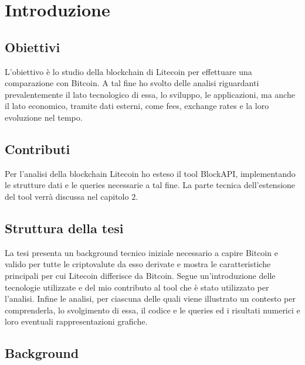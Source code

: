\chapter{Introduzione}

\section{Obiettivi}
L’obiettivo è lo studio della blockchain di Litecoin per effettuare una comparazione con Bitcoin. A tal fine ho svolto delle analisi riguardanti prevalentemente il lato tecnologico di essa, lo sviluppo, le applicazioni, ma anche il lato economico, tramite dati esterni, come fees, exchange rates e la loro evoluzione nel tempo.
\section{Contributi}
Per l’analisi della blockchain Litecoin ho esteso il tool BlockAPI, implementando le strutture dati e le queries necessarie a tal fine. La parte tecnica dell’estensione del tool verrà discussa nel capitolo 2.
\section{Struttura della tesi}
La tesi presenta un background tecnico iniziale necessario a capire Bitcoin e valido per tutte le criptovalute da esso derivate e mostra le caratteristiche principali per cui Litecoin differisce da Bitcoin. Segue un’introduzione delle tecnologie utilizzate e del mio contributo al tool che è stato utilizzato per l’analisi. Infine le analisi, per ciascuna delle quali viene illustrato un contesto per comprenderla, lo svolgimento di essa, il codice e le queries ed i risultati numerici e loro eventuali rappresentazioni grafiche.

\section{Background}
